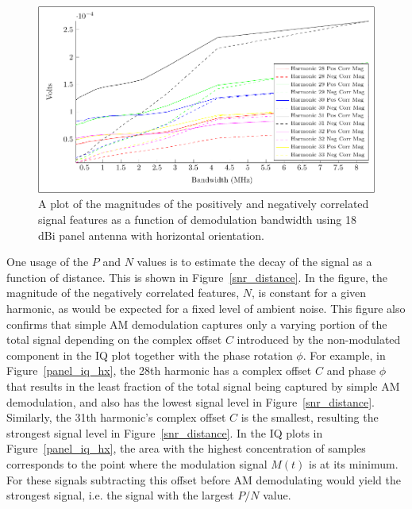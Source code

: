 \begin{figure}[hbt]
\includegraphics[width=5in]{snr_bandwidth}
\caption{A plot of the magnitudes of the positively and negatively correlated signal features as a function of demodulation bandwidth using 18 dBi panel antenna with horizontal orientation.}
\label{snr_bandwidth}
\end{figure}


One usage of the $P$ and $N$ values is to estimate the decay of the signal as a function of distance. This is shown in Figure~\ref{snr_distance}. In the figure, the magnitude of the negatively correlated features, $N$, is constant for a given harmonic, as would be expected for a fixed level of ambient noise. This figure also confirms that simple AM demodulation captures only a varying portion of the total signal depending on the complex offset $C$ introduced by the non-modulated component in the IQ plot together with the phase rotation $\phi$. For example, in Figure~\ref{panel_iq_hx}, the 28th harmonic has a complex offset $C$ and phase $\phi$ that results in the least fraction of the total signal being captured by simple AM demodulation, and also has the lowest signal level in Figure~\ref{snr_distance}. Similarly, the 31th harmonic's complex offset $C$ is the smallest, resulting the strongest signal level in Figure~\ref{snr_distance}. In the IQ plots in Figure~\ref{panel_iq_hx}, the area with the highest concentration of samples corresponds to the point where the modulation signal $M(t)$ is at its minimum. For these signals subtracting this offset before AM demodulating would yield the strongest signal, i.e. the signal with the largest $P/N$ value.


